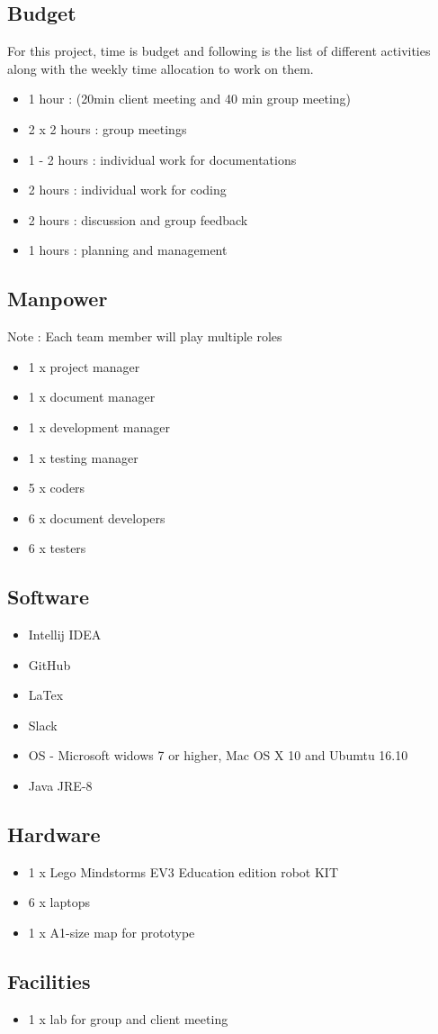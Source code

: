 \subsection{Budget}
For this project, time is budget and following is the list of different activities along with the weekly time allocation to work on them.  
\begin{itemize}
\item 1 hour  : (20min client meeting and 40 min group meeting)
\item 2 x 2 hours : group meetings 
\item 1 - 2 hours : individual work for documentations
\item 2 hours : individual work for coding 
\item 2 hours : discussion and group feedback  
\item 1 hours : planning and management
\end{itemize}

\subsection{Manpower}
Note : Each team member will play multiple roles 
\begin{itemize}
\item 1 x project manager
\item 1 x document manager
\item 1 x development manager
\item 1 x testing manager
\item 5 x coders
\item 6 x document developers
\item 6 x testers
\end{itemize}
\subsection{Software}
\begin{itemize}
\item Intellij IDEA
\item GitHub
\item LaTex
\item Slack
\item OS - Microsoft widows 7 or higher, Mac OS X 10 and Ubumtu 16.10
\item Java JRE-8
\end{itemize}

\subsection{Hardware}
\begin{itemize}
\item 1 x Lego Mindstorms EV3 Education edition robot KIT
\item 6 x laptops
\item 1 x A1-size map for prototype
\end{itemize}

\subsection{Facilities}
\begin{itemize}
\item 1 x lab for group and client meeting 
\end{itemize}
